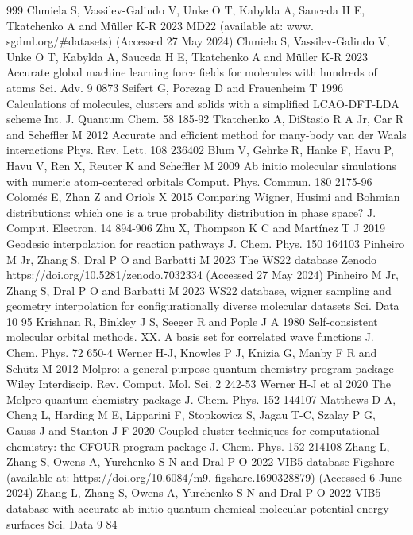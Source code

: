 \documentclass[12pt]{article}
\begin{document}
\begin{thebibliography}{999}
 Chmiela S, Vassilev-Galindo V, Unke O T, Kabylda A, Sauceda H E, Tkatchenko A and Müller K-R 2023 MD22 (available at: www. sgdml.org/\#datasets) (Accessed 27 May 2024)
 Chmiela S, Vassilev-Galindo V, Unke O T, Kabylda A, Sauceda H E, Tkatchenko A and Müller K-R 2023 Accurate global machine learning force fields for molecules with hundreds of atoms Sci. Adv. 9 0873
 Seifert G, Porezag D and Frauenheim T 1996 Calculations of molecules, clusters and solids with a simplified LCAO-DFT-LDA scheme Int. J. Quantum Chem. 58 185-92
 Tkatchenko A, DiStasio R A Jr, Car R and Scheffler M 2012 Accurate and efficient method for many-body van der Waals interactions Phys. Rev. Lett. 108 236402
 Blum V, Gehrke R, Hanke F, Havu P, Havu V, Ren X, Reuter K and Scheffler M 2009 Ab initio molecular simulations with numeric atom-centered orbitals Comput. Phys. Commun. 180 2175-96
 Colomés E, Zhan Z and Oriols X 2015 Comparing Wigner, Husimi and Bohmian distributions: which one is a true probability distribution in phase space? J. Comput. Electron. 14 894-906
 Zhu X, Thompson K C and Martínez T J 2019 Geodesic interpolation for reaction pathways J. Chem. Phys. 150 164103
 Pinheiro M Jr, Zhang S, Dral P O and Barbatti M 2023 The WS22 database Zenodo https://doi.org/10.5281/zenodo.7032334 (Accessed 27 May 2024)
 Pinheiro M Jr, Zhang S, Dral P O and Barbatti M 2023 WS22 database, wigner sampling and geometry interpolation for configurationally diverse molecular datasets Sci. Data 10 95
 Krishnan R, Binkley J S, Seeger R and Pople J A 1980 Self-consistent molecular orbital methods. XX. A basis set for correlated wave functions J. Chem. Phys. 72 650-4
 Werner H-J, Knowles P J, Knizia G, Manby F R and Schütz M 2012 Molpro: a general-purpose quantum chemistry program package Wiley Interdiscip. Rev. Comput. Mol. Sci. 2 242-53
 Werner H-J et al 2020 The Molpro quantum chemistry package J. Chem. Phys. 152 144107
 Matthews D A, Cheng L, Harding M E, Lipparini F, Stopkowicz S, Jagau T-C, Szalay P G, Gauss J and Stanton J F 2020 Coupled-cluster techniques for computational chemistry: the CFOUR program package J. Chem. Phys. 152 214108
 Zhang L, Zhang S, Owens A, Yurchenko S N and Dral P O 2022 VIB5 database Figshare (available at: https://doi.org/10.6084/m9. figshare.1690328879) (Accessed 6 June 2024)
 Zhang L, Zhang S, Owens A, Yurchenko S N and Dral P O 2022 VIB5 database with accurate ab initio quantum chemical molecular potential energy surfaces Sci. Data 9 84

\end{thebibliography}
\end{document}
